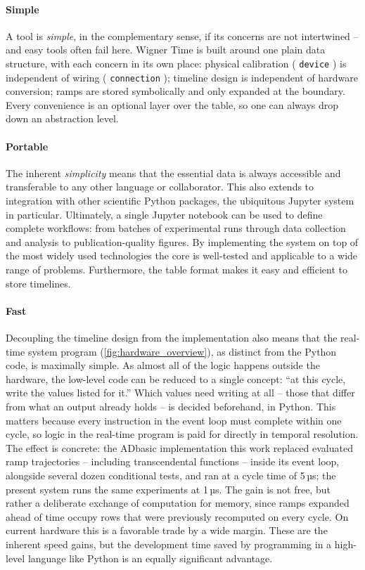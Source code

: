 \documentclass{SciPost}
\newcommand{\python}[1]{%
  \texttt{#1}%
}
\begin{document}
\paragraph{Simple} A tool is \emph{simple}, in the complementary sense, if its
concerns are not intertwined – and easy tools often fail here. Wigner Time is
built around one plain data structure, with each concern in its own place:
physical calibration (\python{device}) is independent of wiring
(\python{connection}); timeline design is independent of hardware conversion;
ramps are stored symbolically and only expanded at the boundary. Every
convenience is an optional layer over the table, so one can always drop down an
abstraction level.
 
\paragraph{Portable} The inherent \emph{simplicity} means that the essential data is always accessible and transferable to any other language or collaborator. This also extends to integration with other scientific Python packages, the ubiquitous Jupyter system in particular. Ultimately, a single Jupyter notebook can be used to define complete workflows: from batches of experimental runs through data collection and analysis to publication-quality figures. By implementing the system on top of the most widely used technologies the core is well-tested and applicable to a wide range of problems. Furthermore, the table format makes it easy and efficient to store timelines.
 
\paragraph{Fast} Decoupling the timeline design from the implementation also means
that the real-time system program (\cref{fig:hardware_overview}), as distinct from
the Python code, is maximally simple. As almost all of the logic happens outside
the hardware, the low-level code can be reduced to a single concept: “at this cycle,
write the values listed for it.” Which values need writing at all – those that
differ from what an output already holds – is decided beforehand, in Python. This matters because every instruction in the event loop must
complete within one cycle, so logic in the real-time program is paid for directly
in temporal resolution. The effect is concrete: the ADbasic implementation this
work replaced evaluated ramp trajectories – including transcendental functions –
inside its event loop, alongside several dozen conditional tests, and ran at a
cycle time of 5\,µs; the present system runs the same experiments at 1\,µs. The
gain is not free, but rather a deliberate exchange of computation for memory,
since ramps expanded ahead of time occupy rows that were previously recomputed on
every cycle. On current hardware this is a favorable trade by a wide margin.
These are the inherent speed gains, but the development time saved by programming
in a high-level language like Python is an equally significant advantage.
 
\end{document}
